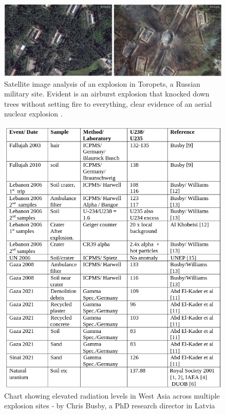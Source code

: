\documentclass[10pt,twocolumn,letterpaper]{article}
\begin{document}
\begin{figure}[t]
\begin{center}
\includegraphics[width=1\textwidth]{toropets.png}
\end{center}
   \caption{Satellite image analysis of an explosion in Toropets, a Russian military site. Evident is an airburst explosion that knocked down trees without setting fire to everything, clear evidence of an aerial nuclear explosion \cite{24}.}
   \label{fig:13}
\end{figure}

\begin{figure}[t]
\begin{center}
\includegraphics[width=1\textwidth]{nukes.png}
\end{center}
   \caption{Chart showing elevated radiation levels in West Asia across multiple explosion sites - by Chris Busby, a PhD research director in Latvia \cite{32,33}}
   \label{fig:14}
\end{figure}
\end{document}
